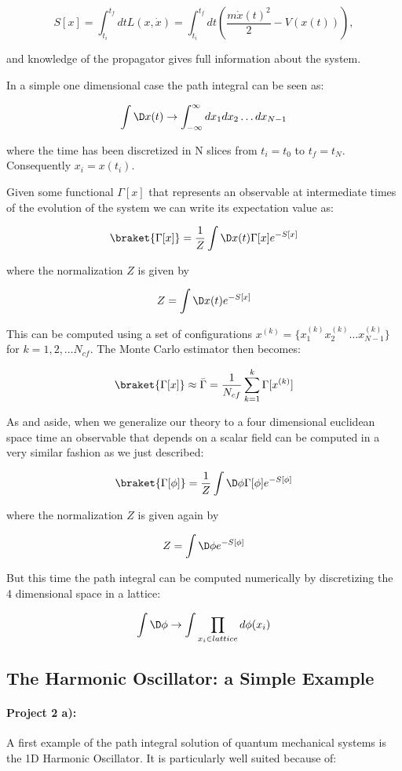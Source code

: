 \documentclass[%
oneside,                 %
final,                   %
10pt]{article}
\begin{document}
\[
	S[x] = \int_{t_i}^{t_f} dt L(x,\dot{x}) =  \int_{t_i}^{t_f} dt \left( \frac{m\dot{x}(t)^2}{2} - V(x(t))\right),
\]

and  knowledge of the propagator gives full information about the system.

In a simple one dimensional case the path integral can be seen as:

\[
	 \int \D x(t) \rightarrow \int_{-\infty}^{\infty} dx_1dx_2\dots dx_{N-1}
\]

where the time has been discretized in N slices from $t_i = t_0$ to $t_f = t_N$. Consequently $x_i = x(t_i)$.  

Given some functional $\Gamma[x]$ that represents an observable at intermediate times of the evolution of the system we can write its expectation value as:

\[
	\braket{\Gamma[x]} = \frac{1}{Z} \int \D x(t) \Gamma[x] e^{-S[x]}
\]

where the normalization $Z$ is given by 

\[
	Z = \int \D x(t) e^{-S[x]}
\]

This can be computed using a set of configurations $x^{(k)} = \{x^{(k)}_1x^{(k)}_2\dots x^{(k)}_{N-1} \}$ for $k = 1,2,\dots N_{cf}$. The Monte Carlo estimator then becomes:

\[
	\braket{\Gamma[x]} \approx \bar{\Gamma} = \frac{1}{N_{cf}} \sum_{k = 1}^k \Gamma[x^{(k)}]
\]

As and aside, when we generalize our theory to a four dimensional
euclidean space time an observable that depends on a scalar field can
be computed in a very similar fashion as we just described:

\[
	\braket{\Gamma[\phi]} = \frac{1}{Z} \int \D \phi \Gamma[\phi] e^{-S[\phi]}
\]

where the normalization $Z$ is given again by 

\[
	Z = \int \D \phi e^{-S[\phi]}
\]

But this time the path integral can be computed numerically by discretizing the 4 dimensional space in a lattice:

\[
	 \int \D \phi \rightarrow \int \prod_{x_i \in lattice} d\phi(x_i)
\] 

\subsection{The Harmonic Oscillator: a Simple Example}

\paragraph{Project 2 a):}
A first example of the path integral solution of quantum mechanical systems is  the 1D Harmonic Oscillator. It is particularly well suited because of:
\end{document}
